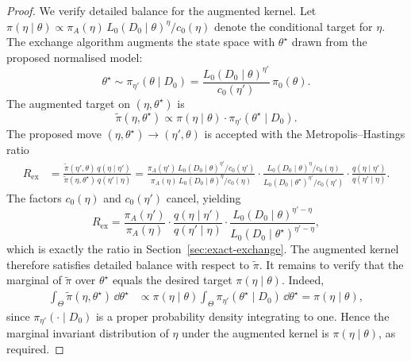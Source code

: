 \begin{proof}
We verify detailed balance for the augmented kernel.
Let $\pi(\eta \mid \theta) \propto \pi_A(\eta)\, L_0(D_0 \mid \theta)^\eta / c_0(\eta)$ denote the conditional target for $\eta$.
The exchange algorithm augments the state space with $\theta^\star$ drawn from the proposed normalised model:
\begin{equation}
    \theta^\star \sim \pi_{\eta'}(\theta \mid D_0)
    =
    \frac{L_0(D_0 \mid \theta)^{\eta'}}{c_0(\eta')}\,\pi_0(\theta).
\end{equation}
The augmented target on $(\eta, \theta^\star)$ is
\begin{equation}
    \widetilde\pi(\eta, \theta^\star)
    \propto
    \pi(\eta \mid \theta)\cdot \pi_{\eta'}(\theta^\star \mid D_0).
\end{equation}
The proposed move $(\eta, \theta^\star) \to (\eta', \theta)$ is accepted with the Metropolis--Hastings ratio
\begin{align}
    R_{\mathrm{ex}}
    &=
    \frac{\widetilde\pi(\eta', \theta)\, q(\eta \mid \eta')}
         {\widetilde\pi(\eta, \theta^\star)\, q(\eta' \mid \eta)}
    =
    \frac{\pi_A(\eta')\, L_0(D_0 \mid \theta)^{\eta'} / c_0(\eta')}
         {\pi_A(\eta)\, L_0(D_0 \mid \theta)^{\eta} / c_0(\eta)}
    \cdot
    \frac{L_0(D_0 \mid \theta)^{\eta} / c_0(\eta)}
         {L_0(D_0 \mid \theta^\star)^{\eta'} / c_0(\eta')}
    \cdot
    \frac{q(\eta \mid \eta')}{q(\eta' \mid \eta)}.
\end{align}
The factors $c_0(\eta)$ and $c_0(\eta')$ cancel, yielding
\begin{equation}
    R_{\mathrm{ex}}
    =
    \frac{\pi_A(\eta')}{\pi_A(\eta)}
    \cdot
    \frac{q(\eta \mid \eta')}{q(\eta' \mid \eta)}
    \cdot
    \frac{L_0(D_0 \mid \theta)^{\eta' - \eta}}
         {L_0(D_0 \mid \theta^\star)^{\eta' - \eta}},
\end{equation}
which is exactly the ratio in Section~\ref{sec:exact-exchange}.
The augmented kernel therefore satisfies detailed balance with respect to $\widetilde\pi$.
It remains to verify that the marginal of $\widetilde\pi$ over $\theta^\star$ equals the desired target $\pi(\eta \mid \theta)$.
Indeed,
\begin{align}
    \int_\Theta \widetilde\pi(\eta, \theta^\star) \, \dd\theta^\star
    &\propto
    \pi(\eta \mid \theta)
    \int_\Theta \pi_{\eta'}(\theta^\star \mid D_0) \, \dd\theta^\star
    =
    \pi(\eta \mid \theta),
\end{align}
since $\pi_{\eta'}(\cdot \mid D_0)$ is a proper probability density integrating to one.
Hence the marginal invariant distribution of $\eta$ under the augmented kernel is $\pi(\eta \mid \theta)$, as required.
\end{proof}

